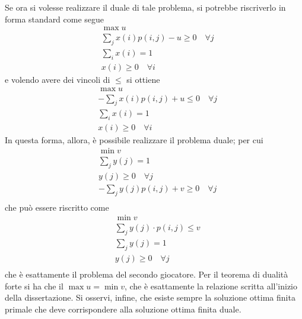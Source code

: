 \documentclass[a4paper]{extarticle}
\begin{document}
\vspace{2em}
\noindent
Se ora si volesse realizzare il duale di tale problema, si potrebbe riscriverlo in forma standard come segue
\begin{align*}
    &\max u\\
    &\sum_j x(i) p(i,j)-u\geq 0 \hspace{1em} \forall j\\
    &\sum_i x(i)=1\\
    &x(i) \geq 0 \hspace{1em} \forall i
\end{align*}
e volendo avere dei vincoli di $\leq$ si ottiene
\begin{align*}
    &\max u\\
    &-\sum_j x(i) p(i,j)+u\leq 0 \hspace{1em} \forall j\\
    &\sum_i x(i)=1\\
    &x(i) \geq 0 \hspace{1em} \forall i
\end{align*}
In questa forma, allora, è possibile realizzare il problema duale; per cui
\begin{align*}
    &\min v\\
    &\sum_j y(j)=1\\
    &y(j) \geq 0 \hspace{1em} \forall j\\
    &-\sum_j y(j) p(i,j)+v\geq 0 \hspace{1em} \forall j\\
\end{align*}
che può essere riscritto come
\begin{align*}
    &\min v\\
    &\sum_j y(j) \cdot p(i,j) \leq v\\
    &\sum_j y(j) = 1\\
    &y(j) \geq 0 \hspace{1em} \forall j\\
\end{align*}
che è esattamente il problema del secondo giocatore. Per il teorema di dualità forte si ha che il $\max u = \min v$, che è esattamente la relazione scritta all'inizio della dissertazione. Si osservi, infine, che esiste sempre la soluzione ottima finita primale che deve corrispondere alla soluzione ottima finita duale.
\end{document}
